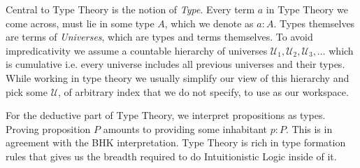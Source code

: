 \documentclass[12pt]{report}
\theoremstyle{definition}
\begin{document}
Central to Type Theory is the notion of \textit{Type}. Every term $a$ in Type Theory we come across, must lie in some type $A$, which we denote as $a : A$. 
Types themselves are terms of \textit{Universes}, which are types and terms themselves. 
To avoid impredicativity we assume a countable hierarchy of universes $\mathcal{U}_1,\mathcal{U}_2,\mathcal{U}_3,\ldots$ which is cumulative i.e. every universe includes all previous universes and their types. 
While working in type theory we usually simplify our view of this hierarchy and pick some $\mathcal{U}$, of arbitrary index that we do not specify, to use as our workspace. 

For the deductive part of Type Theory, we interpret propositions as types. 
Proving proposition $P$ amounts to providing some inhabitant $p : P$. 
This is in agreement with the BHK interpretation. 
Type Theory is rich in type formation rules that gives us the breadth required to do Intuitionistic Logic inside of it. 
\end{document}
